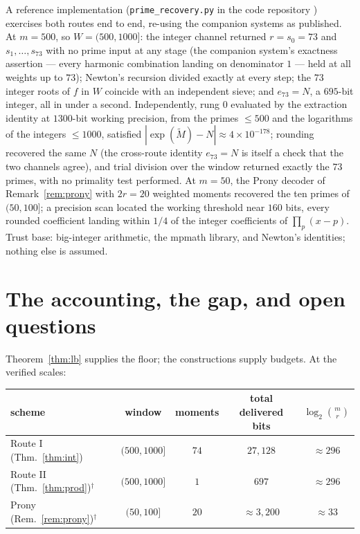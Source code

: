 \documentclass[11pt]{article}
\theoremstyle{remark}
\begin{document}
A reference implementation (\texttt{prime\_recovery.py} in the code repository \cite{Code}) exercises
both routes end to end, re-using the companion systems as published. At $m = 500$, so
$W = (500, 1000]$: the integer channel returned $r = s_0 = 73$ and $s_1, \dots, s_{73}$ with no prime
input at any stage (the companion system's exactness assertion --- every harmonic combination landing
on denominator $1$ --- held at all weights up to $73$); Newton's recursion divided exactly at every
step; the $73$ integer roots of $f$ in $W$ coincide with an independent sieve; and
$e_{73} = N$, a $695$-bit integer, all in under a second. Independently, rung $0$ evaluated by the
extraction identity at $1300$-bit working precision, from the primes $\le 500$ and the logarithms of
the integers $\le 1000$, satisfied $|\exp(\widetilde M) - N| \approx 4 \times 10^{-178}$; rounding
recovered the same $N$ (the cross-route identity $e_{73} = N$ is itself a check that the two channels
agree), and trial division over the window returned exactly the $73$ primes, with no primality test
performed. At $m = 50$, the Prony decoder of Remark~\ref{rem:prony} with $2r = 20$ weighted moments
recovered the ten primes of $(50, 100]$; a precision scan located the working threshold near $160$
bits, every rounded coefficient landing within $1/4$ of the integer coefficients of
$\prod_p (x - p)$. Trust base: big-integer arithmetic, the mpmath library, and Newton's identities;
nothing else is assumed.

\section{The accounting, the gap, and open questions}

Theorem~\ref{thm:lb} supplies the floor; the constructions supply budgets. At the verified scales:

\begin{center}
\begin{tabular}{lcccc}
\hline
scheme & window & moments & total delivered bits & $\log_2 \binom{m}{r}$ \\
\hline
Route I (Thm.~\ref{thm:int}) & $(500, 1000]$ & $74$ & $27{,}128$ & $\approx 296$ \\
Route II (Thm.~\ref{thm:prod})$^{\dagger}$ & $(500, 1000]$ & $1$ & $697$ & $\approx 296$ \\
Prony (Rem.~\ref{rem:prony})$^{\dagger}$ & $(50, 100]$ & $20$ & $\approx 3{,}200$ & $\approx 33$ \\
\hline
\end{tabular}
\end{center}
\end{document}
